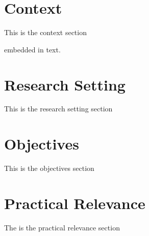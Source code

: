 \section{Context}
This is the context section

\cite{a:1} embedded in text.

\section{Research Setting}
This is the research setting section 

\section{Objectives}
This is the objectives section

\section{Practical Relevance}
The is the practical relevance section